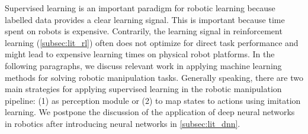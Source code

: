 \documentclass[\home/main.tex]{subfiles}
\begin{document}
Supervised learning is an important paradigm for robotic learning because labelled data provides a clear learning signal. This is important because time spent on robots is expensive. Contrarily, the learning signal in reinforcement learning (\cref{subsec:lit_rl}) often does not optimize for direct task performance and might lead to expensive learning times on physical robot platforms. In the following paragraphs, we discuss relevant work in applying machine learning methods for solving robotic manipulation tasks. Generally speaking, there are two main strategies for applying supervised learning in the robotic manipulation pipeline: (1) as perception module or (2) to map states to actions using imitation learning. We postpone the discussion of the application of deep neural networks in robotics after introducing neural networks in \cref{subsec:lit_dnn}.
\end{document}
